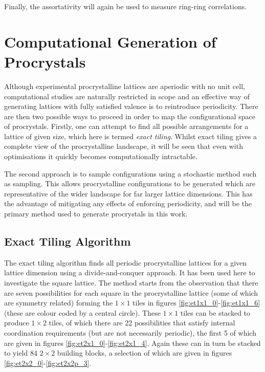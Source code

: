 Finally, the assortativity will again be used to measure ring\--ring correlations. 

\section{Computational Generation of Procrystals}

Although experimental procrystalline lattices are aperiodic with no unit cell, computational studies are naturally restricted in scope and an effective way of generating lattices with fully satisfied valence is to reintroduce periodicity. 
There are then two possible ways to proceed in order to map the configurational space of procrystals.
Firstly, one can attempt to find all possible arrangements for a lattice of given size, which here is termed \textit{exact tiling}.
Whilst exact tiling gives a complete view of the procrystalline landscape, it will be seen that even with optimisations it quickly becomes computationally intractable.

The second approach is to sample configurations using a stochastic method such as \mc{} sampling.
This allows procrystalline configurations to be generated which are representative of the wider landscape for far larger lattice dimensions.
This has the advantage of mitigating any effects of enforcing periodicity, and will be the primary method used to generate procrystals in this work.

\subsection{Exact Tiling Algorithm}

The exact tiling algorithm finds all periodic procrystalline lattices for a given lattice dimension using a divide\--and\--conquer approach.
It has been used here to investigate the square lattice.
The method starts from the observation that there are seven possibilities for each square in the procrystalline lattice (some of which are symmetry related) forming the $1\times 1$ tiles in figures \ref{fig:et1x1_0}\--\ref{fig:et1x1_6} (these are colour coded by a central circle).
These $1\times 1$ tiles can be stacked to produce $1\times 2$ tiles, of which there are 22 possibilities that satisfy internal coordination requirements (but are not necessarily periodic), the first 5 of which are given in figures \ref{fig:et2x1_0}\--\ref{fig:et2x1_4}.
Again these can in turn be stacked to yield 84 $2\times 2$ building blocks, a selection of which are given in figures \ref{fig:et2x2_0}\--\ref{fig:et2x2p_3}.

